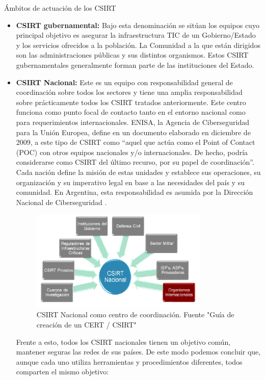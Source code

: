 \begin{section}{Ámbitos de actuación de los CSIRT}
\begin{itemize}
            \item \textbf{CSIRT gubernamental:} Bajo esta denominación se sitúan los equipos cuyo principal objetivo es asegurar la infraestructura TIC de un Gobierno/Estado y los servicios ofrecidos a la población. La Comunidad a la que están dirigidos son las administraciones públicas y sus distintos organismos. Estos CSIRT gubernamentales generalmente forman parte de las instituciones del Estado.
            \item \textbf{CSIRT Nacional:} Este es un equipo con responsabilidad general de coordinación sobre todos los sectores y tiene una amplia responsabilidad sobre prácticamente todos los CSIRT tratados anteriormente. Este centro funciona como punto focal de contacto tanto en el entorno nacional como para requerimientos internacionales. ENISA, la Agencia de Ciberseguridad para la Unión Europea, define en un documento \cite{enisa} elaborado en diciembre de 2009, a este tipo de CSIRT como “aquel que actúa como el Point of Contact (POC) con otros equipos nacionales y/o internacionales. De hecho, podría considerarse como CSIRT  del último recurso, por su papel de coordinación”. Cada nación define la misión de estas unidades y establece sus operaciones, su organización y su imperativo legal en base a las necesidades del país y su comunidad. En Argentina, esta responsabilidad es asumida por la Dirección Nacional de Ciberseguridad \cite{dir_nac_ciber}. 
            \begin{figure}[H]
                \centering
              \includegraphics[width=0.8\textwidth]{./marco_teorico_imagenes/figura_4_csirt_nacional.png}
                \caption{CSIRT Nacional como centro de coordinación. Fuente "Guía de creación de un CERT / CSIRT" \cite{ccn_esp}}
                \label{fig:csirt_nac}
            \end{figure}
            \FloatBarrier
            Frente a esto, todos los CSIRT nacionales tienen un objetivo común, mantener seguras las redes de sus países. De este modo podemos concluir que, aunque cada uno utiliza herramientas y procedimientos diferentes, todos comparten el mismo objetivo:

\end{itemize}
\end{section}
